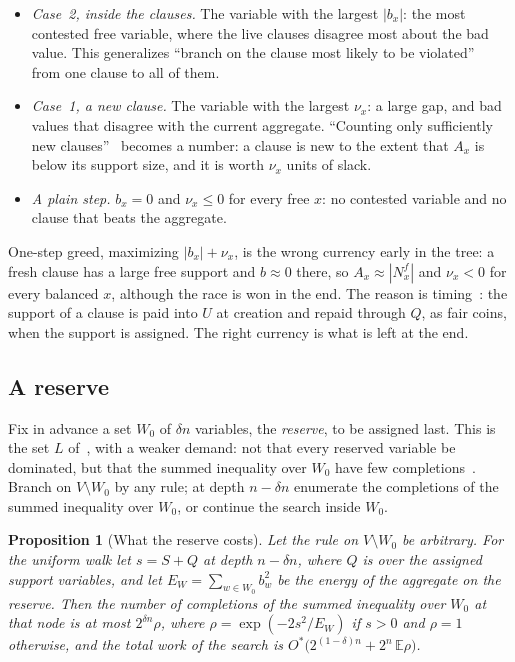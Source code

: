 \documentclass[11pt,a4paper]{article}
\newtheorem{proposition}[theorem]{Proposition}
\theoremstyle{definition}
\theoremstyle{remark}
\newcommand{\Ostar}{O^{*}}
\newcommand{\E}{\mathbb{E}}
\begin{document}
\begin{itemize}
 \item \emph{Case~2, inside the clauses.} The variable with the largest
 $|b_x|$: the most contested free variable, where the live clauses disagree
 most about the bad value. This generalizes ``branch on the clause most likely
 to be violated''~\cite[Section~4]{N4} from one clause to all of them.
 \item \emph{Case~1, a new clause.} The variable with the largest $\nu_x$: a
 large gap, and bad values that disagree with the current aggregate.
 ``Counting only sufficiently new clauses''~\cite[Section~6]{N4} becomes a
 number: a clause is new to the extent that $A_x$ is below its support size,
 and it is worth $\nu_x$ units of slack.
 \item \emph{A plain step.} $b_x=0$ and $\nu_x\le0$ for every free $x$: no
 contested variable and no clause that beats the aggregate.
\end{itemize}

One-step greed, maximizing $|b_x|+\nu_x$, is the wrong currency early in the
tree: a fresh clause has a large free support and $b\approx0$ there, so
$A_x\approx|N^f_x|$ and $\nu_x<0$ for every balanced $x$, although the race is
won in the end. The reason is timing~\cite[Remark~29]{N3}: the support of a
clause is paid into $U$ at creation and repaid through $Q$, as fair coins,
when the support is assigned. The right currency is what is left at the end.

\subsection{A reserve}

Fix in advance a set $W_0$ of $\delta n$ variables, the \emph{reserve}, to be
assigned last. This is the set $L$ of~\cite[Section~7]{N2}, with a weaker
demand: not that every reserved variable be dominated, but that the summed
inequality over $W_0$ have few completions~\cite{EE}. Branch on $V\setminus W_0$
by any rule; at depth $n-\delta n$ enumerate the completions of the summed
inequality over $W_0$, or continue the search inside $W_0$.

\begin{proposition}[What the reserve costs]\label{prop:reserve}
Let the rule on $V\setminus W_0$ be arbitrary. For the uniform walk let
$s=S+Q$ at depth $n-\delta n$, where $Q$ is over the assigned support
variables, and let $E_W=\sum_{w\in W_0}b_w^2$ be the energy of the aggregate
on the reserve. Then the number of completions of the summed inequality over
$W_0$ at that node is at most $2^{\delta n}\rho$, where $\rho=\exp(-2s^2/E_W)$ if
$s>0$ and $\rho=1$ otherwise, and the total work of the search is
$\Ostar\bigl(2^{(1-\delta)n}+2^n\,\E\rho\bigr)$.
\end{proposition}
\end{document}
